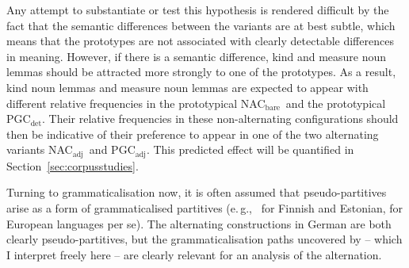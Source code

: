 \documentclass[USenglish]{article}
\newcommand{\eg}{e.\,g.,}
\newcommand{\Sub}[1]{\ensuremath{\mathrm{_{#1}}}}
\newcommand{\NACb}{NAC\Sub{bare}}
\newcommand{\NACa}{NAC\Sub{adj}}
\newcommand{\PGCd}{PGC\Sub{det}}
\newcommand{\PGCa}{PGC\Sub{adj}}
\begin{document}
Any attempt to substantiate or test this hypothesis is rendered difficult by the fact that the semantic differences between the variants are at best subtle, which means that the prototypes are not associated with clearly detectable differences in meaning.
However, if there is a semantic difference, kind and measure noun lemmas should be attracted more strongly to one of the prototypes.
As a result, kind noun lemmas and measure noun lemmas are expected to appear with different relative frequencies in the prototypical \NACb\ and the prototypical \PGCd.
Their relative frequencies in these non-alternating configurations should then be indicative of their preference to appear in one of the two alternating variants \NACa\ and \PGCa.
This predicted effect will be quantified in Section~\ref{sec:corpusstudies}.

Turning to grammaticalisation now, it is often assumed that pseudo-partitives arise as a form of grammaticalised partitives (\eg\ \citealp[536--539]{Koptjevskaja2001} for Finnish and Estonian, \citealp[559]{Koptjevskaja2001} for European languages per se).
%
%
%
%
The alternating constructions in German are both clearly pseudo-partitives, but the grammaticalisation paths uncovered by \cite[esp.\ 526--530]{Koptjevskaja2001} -- which I interpret freely here -- are clearly relevant for an analysis of the alternation.
\end{document}
